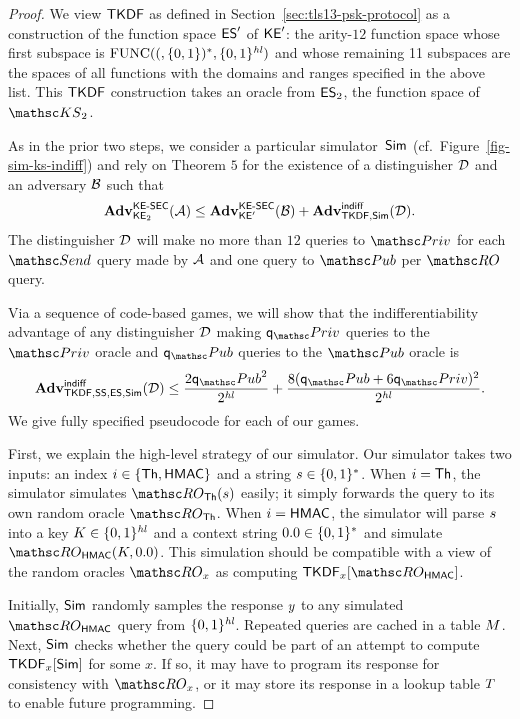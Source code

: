 \begin{proof}
	We view $\mathsf{TKDF}$ as defined in Section~\ref{sec:tls13-psk-protocol} as a construction of the function space $\mathsf{ES}'$ of $\mathsf{KE}'$:
	the arity-$12$ function space whose first subspace is $\mathrm{FUNC}((,\{0,1\})^*,\allowbreak \{0,1\}^{\mathit{hl}})$ and whose remaining 11 subspaces are the spaces of all functions with the domains and ranges specified in the above list. 
	This $\mathsf{TKDF}$ construction takes an oracle from $\mathsf{ES}_2$, the function space of $\KS_2$. 
	
	As in the prior two steps, we consider a particular simulator~$\mathsf{Sim}$ (cf.\ Figure~\ref{fig-sim-ks-indiff}) and rely on Theorem $5$ for the existence of a distinguisher $\mathcal{D}$ and an adversary $\mathcal{B}$ such that 
	\[ \mathbf{Adv}^{\mathrm{\mathsf{KE{\text{\normalfont-}}SEC}}}_{\mathsf{KE}_2}(\mathcal{A}) \leq \mathbf{Adv}^{\mathrm{\mathsf{KE{\text{\normalfont-}}SEC}}}_{\mathsf{KE}'}(\mathcal{B}) + \mathbf{Adv}^{\mathrm{\mathsf{indiff}}}_{\mathbf{\mathsf{TKDF}},\mathsf{Sim}}(\mathcal{D}). \]
	The distinguisher $\mathcal{D}$ will make no more than $12$ queries to $\PrivO$ for each $\Send$ query made by $\mathcal{A}$ and one query to $\PubO$ per $\RO$ query.
	
	Via a sequence of code-based games, we will show that the indifferentiability advantage of any distinguisher $\mathcal{D}$ making $\qPriv$ queries to the $\PrivO$ oracle and $\qPub$ queries to the $\PubO$ oracle is
	\[\genAdv{\indiff}{\construct{\TLSKDF}, \SSp, \ESp, \Sim}{\advD}\leq \frac{2\qPub^2}{2^{\hashlen}} + \frac{8(\qPub+6\qPriv)^2}{2^{\hashlen}}.\]
	We give fully specified pseudocode for each of our games. 
	
	First, we explain the high-level strategy of our simulator.
	Our simulator takes two inputs: an index $i \in \{\mathsf{Th}, \mathsf{HMAC} \}$ and a string $s \in \{0,1\}^*$. 
	When $i = \mathsf{Th}$, the simulator simulates $\ROthash(\simInString)$ easily; it simply forwards the query to its own random oracle $\ROthash$.
	When $i = \mathsf{HMAC}$, the simulator will parse $s$ into a key $K \in \{0,1\}^{\mathit{hl}}$ and a context string $\hmactext \in \bits^*$ and simulate $\ROhmac(\hmackey,\hmactext)$. 
	This simulation should be compatible with a view of the random oracles $\RO_x$ as computing $\TLSKDF_x[\ROhmac]$. 
	
	Initially, $\mathsf{Sim}$ randomly samples the response $y$ to any simulated $\ROhmac$ query from $\{0,1\}^{\mathit{hl}}$.
	Repeated queries are cached in a table $M$.
	Next, $\mathsf{Sim}$ checks whether the query could be part of an attempt to compute $\mathsf{TKDF}_x[\mathsf{Sim}]$ for some $x$.
	If so, it may have to program its response for consistency with $\RO_x$, or it may store its response in a lookup table $T$ to enable future programming.
	

\end{proof}
